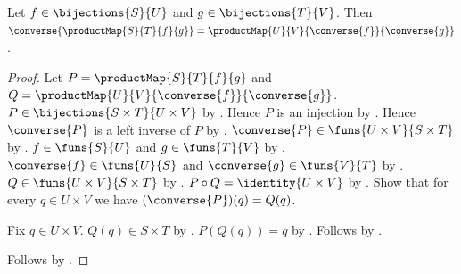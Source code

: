\begin{theorem}\label{product_map_converse}
    Let $f\in\bijections{S}{U}$ and $g\in\bijections{T}{V}$.
    Then $\converse{\productMap{S}{T}{f}{g}}
        =\productMap{U}{V}{\converse{f}}{\converse{g}}$.
\end{theorem}
\begin{proof}
    Let $P=\productMap{S}{T}{f}{g}$ and
        $Q=\productMap{U}{V}{\converse{f}}{\converse{g}}$.
    $P\in\bijections{S\times T}{U\times V}$ by .
    Hence $P$ is an injection by .
    Hence $\converse{P}$ is a left inverse of $P$ by
        .
    $\converse{P}\in\funs{U\times V}{S\times T}$ by
        .
    $f\in\funs{S}{U}$ and $g\in\funs{T}{V}$ by .
    $\converse{f}\in\funs{U}{S}$ and $\converse{g}\in\funs{V}{T}$ by
        .
    $Q\in\funs{U\times V}{S\times T}$ by .
    $P\circ Q=\identity{U\times V}$ by
        .
    Show that for every $q\in U\times V$ we have $(\converse{P})(q)=Q(q)$.
    \begin{subproof}
        Fix $q\in U\times V$.
        $Q(q)\in S\times T$ by .
        $P(Q(q))=q$ by
            .
        Follows by .
    \end{subproof}
    Follows by .
\end{proof}

